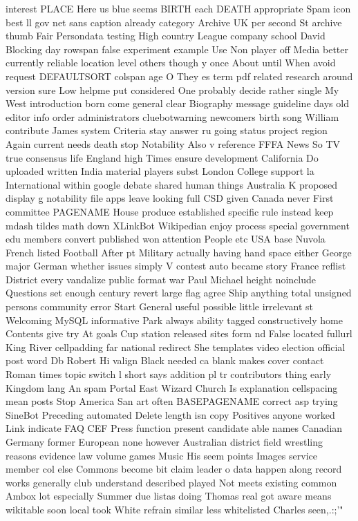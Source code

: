 \documentclass[10pt,a4paper]{article}
\begin{document}
interest PLACE Here us blue seems BIRTH each DEATH appropriate Spam icon best ll gov net sans caption already category Archive UK per second St archive thumb Fair Persondata testing High country League company school David Blocking day rowspan false experiment example Use Non player off Media better currently reliable location level others though y once About until When avoid request DEFAULTSORT colspan age O They es term pdf related research around version sure Low helpme put considered One probably decide rather single My West introduction born come general clear Biography message guideline days old editor info order administrators cluebotwarning newcomers birth song William contribute James system Criteria stay answer ru going status project region Again current needs death stop Notability Also v reference FFFA News So TV true consensus life England high Times ensure development California Do uploaded written India material players subst London College support la International within google debate shared human things Australia K proposed display g notability file apps leave looking full CSD given Canada never First committee PAGENAME House produce established specific rule instead keep mdash tildes math down XLinkBot Wikipedian enjoy process special government edu members convert published won attention People etc USA base Nuvola French listed Football After pt Military actually having hand space either George major German whether issues simply V contest auto became story France reflist District every vandalize public format war Paul Michael height noinclude Questions set enough century revert large flag agree Ship anything total unsigned persons community error Start General useful possible little irrelevant st Welcoming MySQL informative Park always ability tagged constructively home Contents give try At goals Cup station released sites form nd False located fullurl King River cellpadding far national redirect She templates video election official post word Db Robert Hi valign Black needed ca blank makes cover contact Roman times topic switch l short says addition pl tr contributors thing early Kingdom lang An spam Portal East Wizard Church Is explanation cellspacing mean posts Stop America San art often BASEPAGENAME correct asp trying SineBot Preceding automated Delete length isn copy Positives anyone worked Link indicate FAQ CEF Press function present candidate able names Canadian Germany former European none however Australian district field wrestling reasons evidence law volume games Music His seem points Images service member col else Commons become bit claim leader o data happen along record works generally club understand described played Not meets existing common Ambox lot especially Summer due listas doing Thomas real got aware means wikitable soon local took White refrain similar less whitelisted Charles seen,.:;'"
\end{document}
